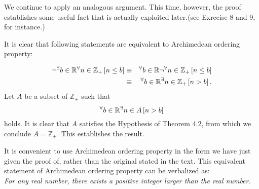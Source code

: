 \documentclass[a4paper,12pt]{article}
\begin{document}
\begin{rem}\label{Archimedean}
	We continue to apply an analogous argument.
	This time, however,
	the proof establishes some useful fact that is actually exploited later.(see Exrceise 8 and 9, for instance.)
	
	It is clear that following statements are equivalent to Archimedean ordering property:
	
	\begin{eqnarray*}
		\neg
		{}^{\exists} b\in \mathbb{R}
		{}^{\forall}  n\in \mathbb{Z}_{+}
		\left[ n \le b \right]
		&\equiv&
		{}^{\forall}  b\in \mathbb{R}
		\neg
		{}^{\forall}  n\in \mathbb{Z}_{+}
		\left[ n \le b \right]\\
		&\equiv&
		{}^{\forall}  b\in \mathbb{R}
		{}^{\exists} n\in \mathbb{Z}_{+}
		\left[ n > b \right].
	\end{eqnarray*}
	Let
	\( A \) be a subset of \( \mathbb{Z}_{+} \) such that 
	\begin{equation*}
		{}^{\forall}  b\in \mathbb{R}
		{}^{\exists} n\in A
		\left[ n > b \right]
	\end{equation*}
	holds.
	It is clear that 
	\( A \)
	satisfies the Hypothesis of Theorem 4.2,
	from which we conclude \( A = \mathbb{Z}_{+}\).
	This establishes the result.
	
	It is convenient to use Archimedean ordering property in the form we have just given the proof of, rather than the original stated in the text.
	This equivalent statement of Archimedean ordering property can be verbalized as:\\
	\textit{For any real number, there exists a positive integer larger than the real number.}
\end{rem}
\end{document}
